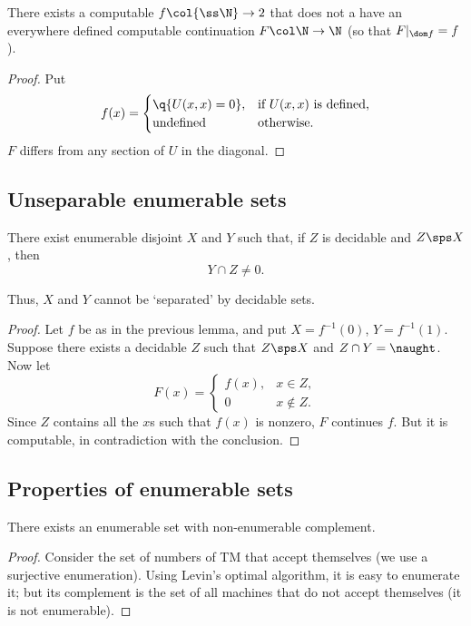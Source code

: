 \begin{lemma}
  There exists a computable $f \col {\ss \N} \to 2$ that does not a have an everywhere defined computable continuation $F \col \N \to \N$ (so that $F|_{\dom f} = f$). 
\end{lemma}

\begin{proof}
  Put
  $$
  f(x) = \begin{cases}
    \q{U(x,x) = 0}, & \text{if $U(x, x)$ is defined,}\\
    \und & \oth.
  \end{cases}
  $$
  $F$ differs from any section of $U$ in the diagonal.
\end{proof}

\subsection{Unseparable enumerable sets}

\begin{lemma}
  There exist enumerable disjoint $X$ and $Y$ such that, if $Z$ is decidable and $Z \sps X$, then
  $$ Y \cap Z \ne 0. $$ 
\end{lemma}

Thus, $X$ and $Y$ cannot be `separated' by decidable sets.

\begin{proof}
  Let $f$ be as in the previous lemma, and put $X = f^{-1}(0)$, $Y = f^{-1}(1)$.
  Suppose there exists a decidable $Z$ such that $Z \sps X$ and $Z \cap Y = \naught$. 
  Now let
  $$
  F(x)
  = \begin{cases}
    f(x), & x \in Z, \\
    0 & x \not\in Z.
  \end{cases}
  $$
  Since $Z$ contains all the $x$s such that $f(x)$ is nonzero, $F$ continues $f$.
  But it is computable, in contradiction with the conclusion.
\end{proof}

\subsection{Properties of enumerable sets}

\begin{lemma}
  There exists an enumerable set with non-enumerable complement.
\end{lemma}

\begin{proof}
  Consider the set of numbers of TM that accept themselves (we use a surjective enumeration).
  Using Levin's optimal algorithm, it is easy to enumerate it; but its complement is the set of all machines that do not accept themselves (it is not enumerable).
\end{proof}

